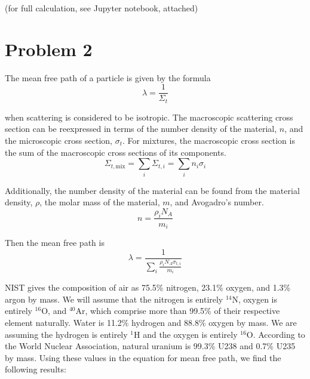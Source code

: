 \documentclass{article}
\begin{document}
(for full calculation, see Jupyter notebook, attached)


\section*{Problem 2}

The mean free path of a particle is given by the formula
$$ \lambda = \frac{1}{\Sigma_t} $$

when scattering is considered to be isotropic. The macroscopic scattering cross section can be reexpressed in terms of the number density of the material, $n$, and the microscopic cross section, $\sigma_t$. For mixtures, the macroscopic cross section is the sum of the macroscopic cross sections of its components.
$$ \Sigma_{t,\text{mix}} = \sum_i \Sigma_{t,i} = \sum_i n_i \sigma_i $$

Additionally, the number density of the material can be found from the material density, $\rho$, the molar mass of the material, $m$, and Avogadro's number.
$$ n = \frac{\rho_i N_A}{m_i} $$

Then the mean free path is
$$ \lambda = \frac{1}{\sum_i \frac{\rho_i N_A \sigma_{t,i}}{m_i}} $$

NIST gives the composition of air as 75.5\% nitrogen, 23.1\% oxygen, and 1.3\% argon by mass. We will assume that the nitrogen is entirely $^{14}$N, oxygen is entirely $^{16}$O, and $^{40}$Ar, which comprise more than 99.5\% of their respective element naturally. Water is 11.2\% hydrogen and 88.8\% oxygen by mass. We are assuming the hydrogen is entirely $^{1}$H and the oxygen is entirely $^{16}$O. According to the World Nuclear Association, natural uranium is 99.3\% U238 and 0.7\% U235 by mass. Using these values in the equation for mean free path, we find the following results:
\end{document}
